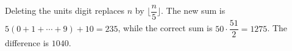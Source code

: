Deleting the units digit replaces $n$ by $\lfloor \dfrac{n}{5}\rfloor$. The new sum is $5(0+1+\cdots+9)+10=235$, while the correct sum is $50\cdot\dfrac{51}{2}=1275$. The difference is $\boxed{1040}$.
